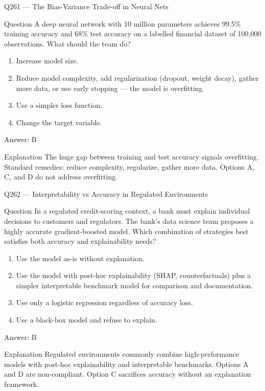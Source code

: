 \documentclass[aspectratio=169,8pt]{beamer}
\begin{document}
\begin{frame}{Q261 --- The Bias-Variance Trade-off in Neural Nets}
\begin{block}{Question}
A deep neural network with 10 million parameters achieves 99.5\% training accuracy and 68\% test accuracy on a labelled financial dataset of 100,000 observations. What should the team do?
\end{block}
\begin{enumerate}
\item Increase model size.
\item Reduce model complexity, add regularization (dropout, weight decay), gather more data, or use early stopping --- the model is overfitting.
\item Use a simpler loss function.
\item Change the target variable.
\end{enumerate}
\begin{exampleblock}{Answer: B}\end{exampleblock}
\begin{block}{Explanation}
The huge gap between training and test accuracy signals overfitting. Standard remedies: reduce complexity, regularize, gather more data. Options A, C, and D do not address overfitting.
\end{block}
\end{frame}

\begin{frame}{Q262 --- Interpretability vs Accuracy in Regulated Environments}
\begin{block}{Question}
In a regulated credit-scoring context, a bank must explain individual decisions to customers and regulators. The bank's data science team proposes a highly accurate gradient-boosted model. Which combination of strategies best satisfies both accuracy and explainability needs?
\end{block}
\begin{enumerate}
\item Use the model as-is without explanation.
\item Use the model with post-hoc explainability (SHAP, counterfactuals) plus a simpler interpretable benchmark model for comparison and documentation.
\item Use only a logistic regression regardless of accuracy loss.
\item Use a black-box model and refuse to explain.
\end{enumerate}
\begin{exampleblock}{Answer: B}\end{exampleblock}
\begin{block}{Explanation}
Regulated environments commonly combine high-performance models with post-hoc explainability and interpretable benchmarks. Options A and D are non-compliant. Option C sacrifices accuracy without an explanation framework.
\end{block}
\end{frame}
\end{document}
